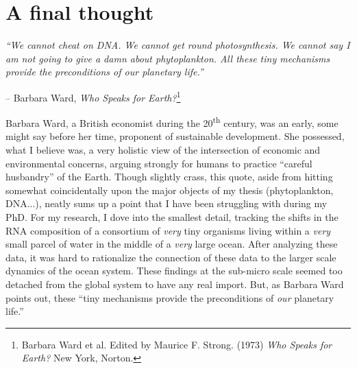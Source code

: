 \section{A final thought}

\textit{``We cannot cheat on DNA. We cannot get round photosynthesis. We cannot say I am not going to give a damn about phytoplankton. All these tiny mechanisms provide the preconditions of our planetary life.'' }
\begin{flushright}-- Barbara Ward, \textit{Who Speaks for Earth?}\footnote{Barbara Ward et al. Edited by Maurice F. Strong. (1973) \textit{Who Speaks for Earth?} New York, Norton. }\end{flushright}

Barbara Ward, a British economist during the 20\textsuperscript{th} century, was an early, some might say before her time, proponent of sustainable development. She possessed, what I believe was, a very holistic view of the intersection of economic and environmental concerns, arguing strongly for humans to practice ``careful husbandry'' of the Earth. Though slightly crass, this quote, aside from hitting somewhat coincidentally upon the major objects of my thesis (phytoplankton, DNA...), neatly sums up a point that I have been struggling with during my PhD. For my research, I dove into the smallest detail, tracking the shifts in the RNA composition of a consortium of \textit{very} tiny organisms living within a \textit{very} small parcel of water in the middle of a \textit{very} large ocean. After analyzing these data, it was hard to rationalize the connection of these data to the larger scale dynamics of the ocean system. These findings at the sub-micro scale seemed too detached from the global system to have any real import. But, as Barbara Ward points out, these ``tiny mechanisms provide the preconditions of \textit{our} planetary life.'' 










